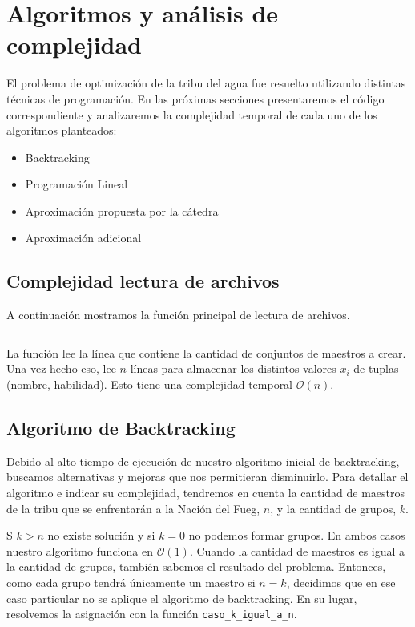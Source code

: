 \documentclass{article}
\begin{document}
\section{Algoritmos y análisis de complejidad}

El problema de optimización de la tribu del agua fue resuelto utilizando distintas técnicas de programación. En las próximas secciones presentaremos el código correspondiente y analizaremos la complejidad temporal de cada uno de los algoritmos planteados:
\begin{itemize}
    \item Backtracking
    \item Programación Lineal
    \item Aproximación propuesta por la cátedra
    \item Aproximación adicional
\end{itemize}

\subsection{Complejidad lectura de archivos}
A continuación mostramos la función principal de lectura de archivos. 
\inputminted[linenos, firstline=30, lastline=45]{python}{codigo/archivos.py}

La función lee la línea que contiene la cantidad de conjuntos de maestros a crear. Una vez hecho eso, lee $n$ líneas para almacenar los distintos valores $x_i$ de tuplas (nombre, habilidad). Esto tiene una complejidad temporal $\mathcal{O}(n)$.

\subsection{Algoritmo de Backtracking}

Debido al alto tiempo de ejecución de nuestro algoritmo inicial de backtracking, buscamos alternativas y mejoras que nos permitieran disminuirlo. Para detallar el algoritmo e indicar su complejidad, tendremos en cuenta la cantidad de maestros de la tribu que se enfrentarán a la Nación del Fueg, $n$, y la cantidad de grupos, $k$.  

S $k > n$ no existe solución y si $k = 0$ no podemos formar grupos. En ambos casos nuestro algoritmo funciona en $\mathcal{O}(1)$. Cuando la cantidad de maestros es igual a la cantidad de grupos, también sabemos el resultado del problema. Entonces, como cada grupo tendrá únicamente un maestro si $n = k$, decidimos que en ese caso particular no se aplique el algoritmo de backtracking. En su lugar, resolvemos la asignación con la función \texttt{caso\_k\_igual\_a\_n}.
\end{document}

